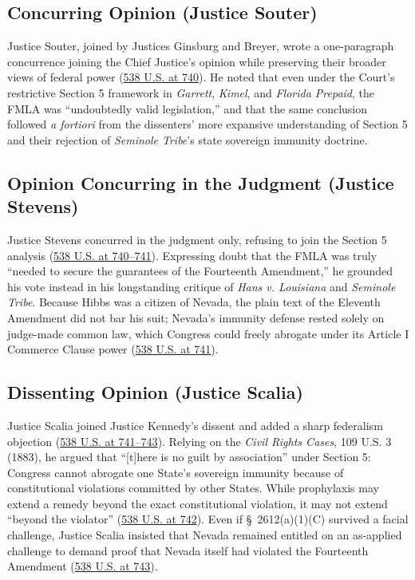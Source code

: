\documentclass[12pt]{article}
\begin{document}
\subsection{Concurring Opinion (Justice Souter)}
Justice Souter, joined by Justices Ginsburg and Breyer, wrote a one-paragraph concurrence joining the Chief Justice's opinion while preserving their broader views of federal power (\href{https://supreme.justia.com/cases/federal/us/538/721/}{538 U.S. at 740}). He noted that even under the Court's restrictive Section 5 framework in \textit{Garrett}, \textit{Kimel}, and \textit{Florida Prepaid}, the FMLA was ``undoubtedly valid legislation,'' and that the same conclusion followed \textit{a fortiori} from the dissenters' more expansive understanding of Section 5 and their rejection of \textit{Seminole Tribe}'s state sovereign immunity doctrine.

\subsection{Opinion Concurring in the Judgment (Justice Stevens)}
Justice Stevens concurred in the judgment only, refusing to join the Section 5 analysis (\href{https://supreme.justia.com/cases/federal/us/538/721/}{538 U.S. at 740--741}). Expressing doubt that the FMLA was truly ``needed to secure the guarantees of the Fourteenth Amendment,'' he grounded his vote instead in his longstanding critique of \textit{Hans v. Louisiana} and \textit{Seminole Tribe}. Because Hibbs was a citizen of Nevada, the plain text of the Eleventh Amendment did not bar his suit; Nevada's immunity defense rested solely on judge-made common law, which Congress could freely abrogate under its Article I Commerce Clause power (\href{https://supreme.justia.com/cases/federal/us/538/721/}{538 U.S. at 741}).

\subsection{Dissenting Opinion (Justice Scalia)}
Justice Scalia joined Justice Kennedy's dissent and added a sharp federalism objection (\href{https://supreme.justia.com/cases/federal/us/538/721/}{538 U.S. at 741--743}). Relying on the \textit{Civil Rights Cases}, 109 U.S. 3 (1883), he argued that ``[t]here is no guilt by association'' under Section 5: Congress cannot abrogate one State's sovereign immunity because of constitutional violations committed by other States. While prophylaxis may extend a remedy beyond the exact constitutional violation, it may not extend ``beyond the violator'' (\href{https://supreme.justia.com/cases/federal/us/538/721/}{538 U.S. at 742}). Even if \S~2612(a)(1)(C) survived a facial challenge, Justice Scalia insisted that Nevada remained entitled on an as-applied challenge to demand proof that Nevada itself had violated the Fourteenth Amendment (\href{https://supreme.justia.com/cases/federal/us/538/721/}{538 U.S. at 743}).
\end{document}
